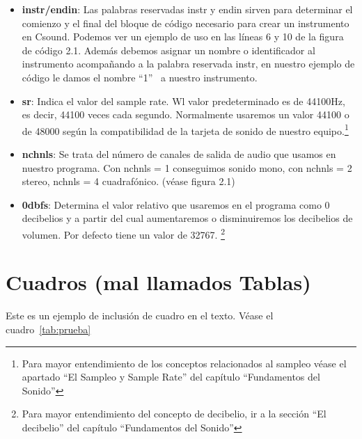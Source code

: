 \begin{itemize}
 \item \textbf{instr/endin}: Las palabras reservadas instr y endin sirven para determinar el comienzo y el final del bloque de código necesario para crear un instrumento en Csound. Podemos ver un ejemplo de uso en las líneas 6 y 10 de la figura de código 2.1.
 Además debemos asignar un nombre o identificador al instrumento acompañando a la palabra reservada instr, en nuestro ejemplo de código le damos el nombre ``1'' \ a nuestro instrumento.
 
 \item \textbf{sr}: Indica el valor del sample rate. Wl valor predeterminado es de 44100Hz, es decir, 44100 veces cada segundo. Normalmente usaremos un valor 44100 o de 48000 según la compatibilidad de la tarjeta de sonido de nuestro equipo.\footnote{Para mayor entendimiento de los conceptos relacionados al sampleo véase el apartado ``El Sampleo y Sample Rate'' del capítulo ``Fundamentos del Sonido''}
 
 \item \textbf{nchnls}: Se trata del número de canales de salida de audio que usamos en nuestro programa. Con nchnls = 1 conseguimos sonido mono, con nchnls = 2 stereo, nchnls = 4 cuadrafónico. (véase figura 2.1)

 \item \textbf{0dbfs}: Determina el valor relativo que usaremos en el programa como 0 decibelios y a partir del cual aumentaremos o disminuiremos los decibelios de volumen. Por defecto tiene un valor de 32767. \footnote{Para mayor entendimiento del concepto de decibelio, ir a la sección ``El decibelio'' del capítulo ``Fundamentos del Sonido''}
\end{itemize}


\section{Cuadros (mal llamados Tablas)}

Este es un ejemplo de inclusi\'on de cuadro en el texto. V\'ease el cuadro~\ref{tab:prueba}

